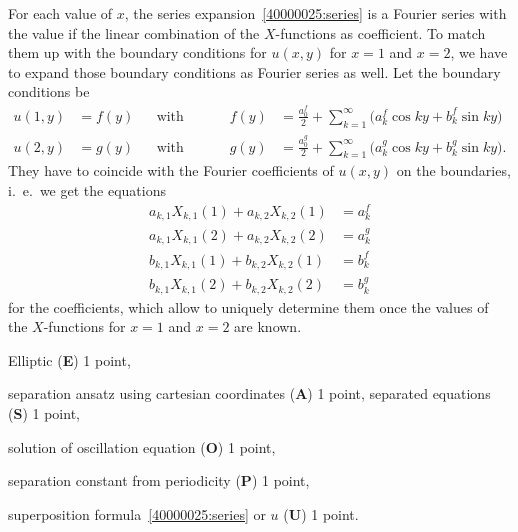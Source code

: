 \begin{diskussion}
For each value of $x$, the series expansion~\eqref{40000025:series}
is a Fourier series with the value if the linear combination of the
$X$-functions as coefficient.
To match them up with the boundary conditions for $u(x,y)$ for $x=1$ and
$x=2$, we have to expand those boundary conditions as Fourier series
as well.
Let the boundary conditions be
\begin{align*}
u(1,y) &= f(y)
&&\text{with Fourier series}&
f(y)
&=
\frac{a^f_0}{2} + \sum_{k=1}^\infty \bigl(a_k^f\cos ky+b_k^f\sin ky\bigr)
\\
u(2,y)&=g(y)
&&\text{with Fourier series}&
g(y)
&=
\frac{a^g_0}{2} + \sum_{k=1}^\infty \bigl(a_k^g\cos ky+b_k^g\sin ky\bigr).
\end{align*}
They have to coincide with the Fourier coefficients of $u(x,y)$ on the
boundaries,
i.~e.~we get the equations
\begin{align*}
a_{k,1}X_{k,1}(1)+a_{k,2}X_{k,2}(1) &= a_k^f \\
a_{k,1}X_{k,1}(2)+a_{k,2}X_{k,2}(2) &= a_k^g
\\[5pt]
b_{k,1}X_{k,1}(1)+b_{k,2}X_{k,2}(1) &= b_k^f \\
b_{k,1}X_{k,1}(2)+b_{k,2}X_{k,2}(2) &= b_k^g
\end{align*}
for the coefficients, which allow to uniquely determine them once the
values of the $X$-functions for $x=1$ and $x=2$ are known.
\end{diskussion}


\begin{bewertung}
\begin{teilaufgaben}
\item Elliptic ({\bf E}) 1 point,
\item separation ansatz using cartesian coordinates ({\bf A}) 1 point,
separated equations ({\bf S}) 1 point,
\item solution of oscillation equation ({\bf O}) 1 point,
\item separation constant from periodicity ({\bf P}) 1 point,
\item superposition formula~\eqref{40000025:series}
 or $u$ ({\bf U}) 1 point.
\end{teilaufgaben}
\end{bewertung}

